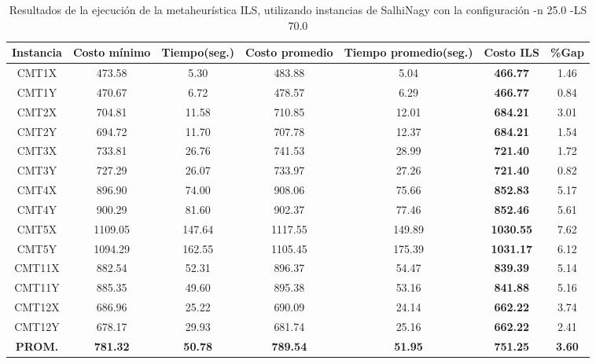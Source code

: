 \begin{table}[ht]
\caption{Resultados de la ejecución de la metaheurística ILS, utilizando instancias de SalhiNagy con la configuración -n 25.0 -LS 70.0}
\centering
\small
\begin{tabular}{c c c c c c c}
\hline\hline
Instancia & Costo mínimo & Tiempo(seg.) & Costo promedio & Tiempo promedio(seg.) & Costo ILS & \%Gap \\ [0.5ex]
\hline
CMT1X & 473.58 & 5.30 & 
483.88 & 5.04 & \bf{466.77} & 
1.46\\CMT1Y & 470.67 & 6.72 & 
478.57 & 6.29 & \bf{466.77} & 
0.84\\CMT2X & 704.81 & 11.58 & 
710.85 & 12.01 & \bf{684.21} & 
3.01\\CMT2Y & 694.72 & 11.70 & 
707.78 & 12.37 & \bf{684.21} & 
1.54\\CMT3X & 733.81 & 26.76 & 
741.53 & 28.99 & \bf{721.40} & 
1.72\\CMT3Y & 727.29 & 26.07 & 
733.97 & 27.26 & \bf{721.40} & 
0.82\\CMT4X & 896.90 & 74.00 & 
908.06 & 75.66 & \bf{852.83} & 
5.17\\CMT4Y & 900.29 & 81.60 & 
902.37 & 77.46 & \bf{852.46} & 
5.61\\CMT5X & 1109.05 & 147.64 & 
1117.55 & 149.89 & \bf{1030.55} & 
7.62\\CMT5Y & 1094.29 & 162.55 & 
1105.45 & 175.39 & \bf{1031.17} & 
6.12\\CMT11X & 882.54 & 52.31 & 
896.37 & 54.47 & \bf{839.39} & 
5.14\\CMT11Y & 885.35 & 49.60 & 
895.38 & 53.16 & \bf{841.88} & 
5.16\\CMT12X & 686.96 & 25.22 & 
690.09 & 24.14 & \bf{662.22} & 
3.74\\CMT12Y & 678.17 & 29.93 & 
681.74 & 25.16 & \bf{662.22} & 
2.41\\\bf{PROM.} & 
\bf{781.32} & \bf{50.78} & \bf{789.54} & \bf{51.95} & \bf{751.25} & \bf{3.60}\\[1ex]\hline
\end{tabular}
\label{table:nonlin}
\end{table} \clearpage
